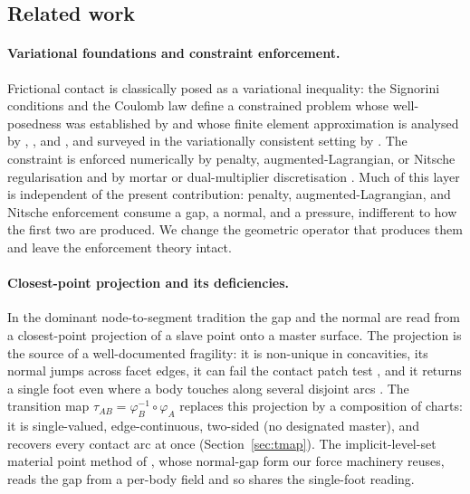 \documentclass{svjour3}                 %
\newcommand{\tmap}{\tau_{AB}}
\newcommand{\map}[1]{\varphi_{#1}}
\begin{document}
\subsection{Related work}\label{sec:intro-related}

\paragraph{Variational foundations and constraint enforcement.}
Frictional contact is classically posed as a variational inequality: the Signorini conditions and the Coulomb
law define a constrained problem whose well-posedness was established by \citet{duvaut1976inequalities} and
whose finite element approximation is analysed by \citet{kikuchi1988contact}, \citet{glowinski1981numerical},
and \citet{haslinger1996numerical}, and surveyed in the variationally consistent setting by
\citet{wohlmuth2011variational}. The constraint is enforced numerically by penalty, augmented-Lagrangian, or
Nitsche regularisation \citep{wriggers2006computational,alart1991mixed,simo1992augmented,laursen1993continuum,
laursen2002computational,chouly2013nitsche,chouly2015symmetric} and by mortar or dual-multiplier discretisation
\citep{puso2004mortar,fischer2005frictionless,wohlmuth2011variational}. Much of this layer is independent of the
present contribution: penalty, augmented-Lagrangian, and Nitsche enforcement consume a gap, a normal, and a
pressure, indifferent to how the first two are produced. We change the geometric operator that produces
them and leave the enforcement theory intact.

\paragraph{Closest-point projection and its deficiencies.}
In the dominant node-to-segment tradition \citep{hallquist1985sliding,wriggers2006computational} the gap and
the normal are read from a closest-point projection of a slave point onto a master surface. The projection is
the source of a well-documented fragility: it is non-unique in concavities, its normal jumps across facet
edges, it can fail the contact patch test \citep{taylor1991patch}, and it returns a single foot even where a
body touches along several disjoint arcs \citep{zavarise2009nts,zavarise2009patchtest}. The
transition map $\tmap=\map{B}^{-1}\circ\map{A}$ replaces this projection by a composition of charts: it is
single-valued, edge-continuous, two-sided (no designated master), and recovers every contact arc at once
(Section~\ref{sec:tmap}). The implicit-level-set material point method of \citet{liu2020implicit}, whose
normal-gap form our force machinery reuses, reads the gap from a per-body field and so shares the single-foot
reading.
\end{document}

